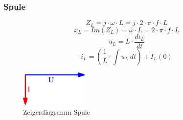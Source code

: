 \subsubsection{Spule}
\[ Z_L = j \cdot \omega \cdot L = j \cdot 2 \cdot \pi \cdot f \cdot L \]
\[ x_L = Im(Z_L) = \omega \cdot L = 2 \cdot \pi \cdot f \cdot L \]
\[ u_L = L \cdot \frac{di_L}{dt} \]
\[ i_L = \left( \frac{1}{L} \cdot \int u_L ~ dt \right) + I_L(0) \]
\begin{figure}[h!]
	\centering
	\includegraphics[width=0.3\textwidth]{../fig/zeig_ui_ind.pdf}
	\caption{Zeigerdiagramm Spule}
	\label{fig:zeig_ui_ind}
\end{figure}
